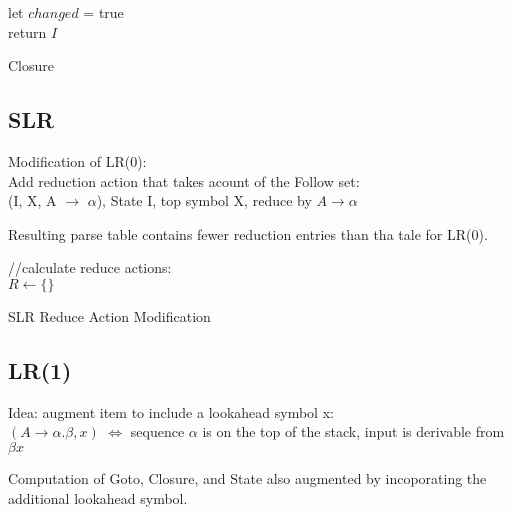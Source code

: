 \documentclass[8pt]{extarticle}
\begin{document}
\begin{multicols*}{2}
  \begin{algorithm}[H]
    let $changed$ = true\\
    return $I$
    \caption{Closure\label{Algo_closure}}
  \end{algorithm}
  
  \vfill\null
  \columnbreak
  
  \subsection{SLR}
  Modification of LR(0):\\
  Add reduction action that takes acount of the Follow set:\\
  (I, X, A $\rightarrow$ $\alpha$), State I, top symbol X, reduce by $A \rightarrow \alpha$

  Resulting parse table contains fewer reduction entries than tha tale for LR(0).

  \begin{algorithm}[H]
    //calculate reduce actions:\\
    $R \leftarrow \{\}$\\
    \caption{SLR Reduce Action Modification\label{Algo_SLR}}
  \end{algorithm}

  \subsection{LR(1)}
  Idea: augment item to include a lookahead symbol x:\\
  $(A \rightarrow \alpha . \beta, x)$ $\iff$ sequence $\alpha$ is on the top of the stack, input is derivable from $\beta x$
  
  Computation of Goto, Closure, and State also augmented by incoporating the additional lookahead symbol.


\end{multicols*}
\end{document}
